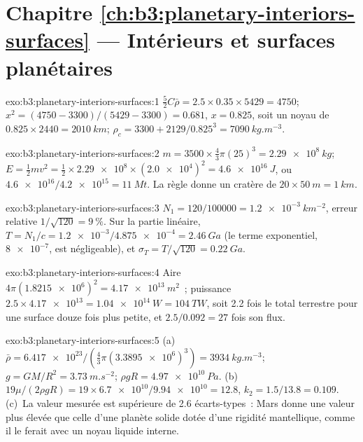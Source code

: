 \section*{Chapitre \ref{ch:b3:planetary-interiors-surfaces} --- Intérieurs et surfaces planétaires}

\begin{solution}{exo:b3:planetary-interiors-surfaces:1}
$\tfrac52C\bar\rho = 2.5\times0.35\times5429 = 4750$; $x^2 = (4750 -
3300)/(5429 - 3300) = 0.681$, $x = 0.825$, soit un noyau de $0.825\times2440 =
\qty{2010}{km}$; $\rho_c = 3300 + 2129/0.825^3 = \qty{7090}{kg.m^{-3}}$.
\end{solution}

\begin{solution}{exo:b3:planetary-interiors-surfaces:2}
$m = 3500\times\tfrac43\pi(25)^3 = \qty{2.29e8}{kg}$; $E = \tfrac12 m v^2 =
\tfrac12\times\num{2.29e8}\times(\num{2.0e4})^2 = \qty{4.6e16}{J}$, ou
$\num{4.6e16}/\num{4.2e15} = \qty{11}{Mt}$. La règle donne un cratère de
$20\times\qty{50}{m} = \qty{1}{km}$.
\end{solution}

\begin{solution}{exo:b3:planetary-interiors-surfaces:3}
$N_1 = 120/\num{100000} = \qty{1.2e-3}{km^{-2}}$, erreur relative $1/\sqrt{120}
= \qty{9}{\percent}$. Sur la partie linéaire, $T = N_1/c = \num{1.2e-3}/\num{4.875e-4}
= \qty{2.46}{Ga}$ (le terme exponentiel, $\num{8e-7}$, est négligeable), et
$\sigma_T = T/\sqrt{120} = \qty{0.22}{Ga}$.
\end{solution}

\begin{solution}{exo:b3:planetary-interiors-surfaces:4}
Aire $4\pi(\num{1.8215e6})^2 = \qty{4.17e13}{m^2}$~; puissance $2.5\times
\num{4.17e13} = \qty{1.04e14}{W} = \qty{104}{TW}$, soit 2.2 fois le total terrestre
pour une surface douze fois plus petite, et $2.5/0.092 = 27$ fois son
flux.
\end{solution}

\begin{solution}{exo:b3:planetary-interiors-surfaces:5}
(a)~$\bar\rho = \num{6.417e23}/(\tfrac43\pi(\num{3.3895e6})^3) =
\qty{3934}{kg.m^{-3}}$; $g = GM/R^2 = \qty{3.73}{m.s^{-2}}$; $\rho gR =
\qty{4.97e10}{Pa}$. (b)~$19\mu/(2\rho gR) = 19\times\num{6.7e10}/\num{9.94e10}
= 12.8$, $k_2 = 1.5/13.8 = 0.109$. (c)~La valeur mesurée est supérieure de
2.6 écarts-types~: Mars donne une valeur plus élevée que celle d'une planète
solide dotée d'une rigidité mantellique, comme il le ferait avec un noyau liquide interne.
\end{solution}

